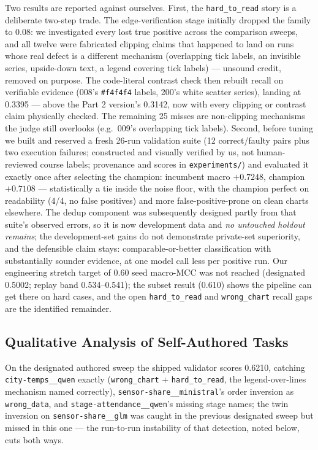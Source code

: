 \documentclass[11pt]{article}
\begin{document}
Two results are reported against ourselves. First, the
\texttt{hard\_to\_read} story is a deliberate two-step trade. The
edge-verification stage initially dropped the family to 0.08: we
investigated every lost true positive across the comparison sweeps, and
all twelve were fabricated clipping claims that happened to land on runs
whose real defect is a different mechanism (overlapping tick labels, an
invisible series, upside-down text, a legend covering tick labels) ---
unsound credit, removed on purpose. The code-literal contrast check then
rebuilt recall on verifiable evidence (008's \texttt{\#f4f4f4} labels,
200's white scatter series), landing at 0.3395 --- above the Part 2
version's 0.3142, now with every clipping or contrast claim physically
checked. The remaining 25 misses are non-clipping mechanisms the judge
still overlooks (e.g.\ 009's overlapping tick labels). Second, before
tuning we built and reserved a fresh 26-run validation suite (12
correct/faulty pairs plus two execution failures; constructed and
visually verified by us, not human-reviewed course labels; provenance
and scores in \texttt{experiments/}) and evaluated it exactly once
after selecting the champion: incumbent macro $+0.7248$, champion
$+0.7108$ --- statistically a tie inside the noise floor, with the
champion perfect on readability (4/4, no false positives) and more
false-positive-prone on clean charts elsewhere. The dedup component was
subsequently designed partly from that suite's observed errors, so it is
now development data and \emph{no untouched holdout remains}; the
development-set gains do not demonstrate private-set superiority, and
the defensible claim stays: comparable-or-better classification with
substantially sounder evidence, at one model call less per positive run.
Our engineering stretch target of 0.60 seed macro-MCC was not reached
(designated 0.5002; replay band 0.534--0.541); the subset result
(0.610) shows the pipeline can get there on hard cases, and the open
\texttt{hard\_to\_read} and \texttt{wrong\_chart} recall gaps are
the identified remainder.

\subsection{Qualitative Analysis of Self-Authored Tasks}
On the designated authored sweep the shipped validator scores 0.6210,
catching \texttt{city-temps\_\_qwen} exactly (\texttt{wrong\_chart}
+ \texttt{hard\_to\_read}, the legend-over-lines mechanism named
correctly), \texttt{sensor-share\_\_ministral}'s order inversion as
\texttt{wrong\_data}, and \texttt{stage-attendance\_\_qwen}'s
missing stage names; the twin inversion on
\texttt{sensor-share\_\_glm} was caught in the previous designated
sweep but missed in this one --- the run-to-run instability of that
detection, noted below, cuts both ways.
\end{document}
